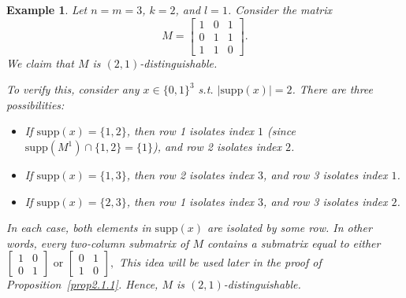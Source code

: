 \documentclass{article}
\newtheorem{example}{Example}[subsection]
\newcommand{\supp}{\mathrm{supp}}
\begin{document}
\begin{example}
Let $n=m=3$, $k=2$, and $l=1$. Consider the matrix
\[
M=
\begin{bmatrix}
1 & 0 & 1 \\
0 & 1 & 1 \\
1 & 1 & 0
\end{bmatrix}.
\]
We claim that $M$ is $(2,1)$-distinguishable.

To verify this, consider any $x\in\{0,1\}^3$ s.t. $|\supp(x)|=2$. There are three possibilities:

\begin{itemize}
    \item If $\supp(x)=\{1,2\}$, then row 1 isolates index $1$ (since $\supp(M^1)\cap\{1,2\}=\{1\}$), and row 2 isolates index $2$.
    \item If $\supp(x)=\{1,3\}$, then row 2 isolates index $3$, and row 3 isolates index $1$.
    \item If $\supp(x)=\{2,3\}$, then row 1 isolates index $3$, and row 3 isolates index $2$.
\end{itemize}


In each case, both elements in $\supp(x)$ are isolated by some row. In other words, every two-column submatrix of $M$ contains a submatrix equal to either
\(\renewcommand{\arraystretch}{0.6}
\begin{bmatrix}
1 & 0 \\[2pt]
0 & 1
\end{bmatrix}
\text{ or } 
\begin{bmatrix}
0 & 1 \\[2pt]
1 & 0
\end{bmatrix},
\)
This idea will be used later in the proof of Proposition~\ref{prop2.1.1}. Hence, $M$ is $(2,1)$-distinguishable.

\end{example}
\end{document}
